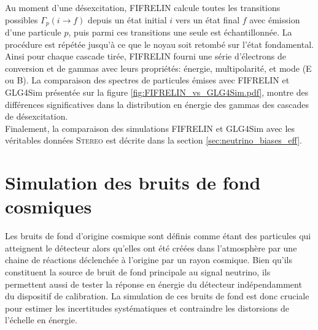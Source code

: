 Au moment d'une désexcitation, FIFRELIN calcule toutes les transitions possibles $\Gamma_p(i \rightarrow f)$ depuis un état initial $i$ vers un état final $f$ avec émission d'une particule $p$, puis parmi ces transitions une seule est échantillonnée. La procédure est répétée jusqu'à ce que le noyau soit retombé sur l'état fondamental. Ainsi pour chaque cascade tirée, FIFRELIN fourni une série d'électrons de conversion et de gammas avec leurs propriétés: énergie, multipolarité, et mode (E ou B). La comparaison des spectres de particules émises avec FIFRELIN et GLG4Sim présentée sur la figure \ref{fig:FIFRELIN_vs_GLG4Sim.pdf}, montre des différences significatives dans la distribution en énergie des gammas des cascades de désexcitation.\\

Finalement, la comparaison des simulations FIFRELIN et GLG4Sim avec les véritables données \textsc{Stereo} est décrite dans la section \ref{sec:neutrino_biases_eff}.

\bigbreak

\section{Simulation des bruits de fond cosmiques}

Les bruits de fond d'origine cosmique sont définis comme étant des particules qui atteignent le détecteur alors qu'elles ont été créées dans l'atmosphère par une chaine de réactions déclenchée à l'origine par un rayon cosmique. Bien qu'ils constituent la source de bruit de fond principale au signal neutrino, ils permettent aussi de tester la réponse en énergie du détecteur indépendamment du dispositif de calibration. La simulation de ces bruits de fond est donc cruciale pour estimer les incertitudes systématiques et contraindre les distorsions de l'échelle en énergie.\\

